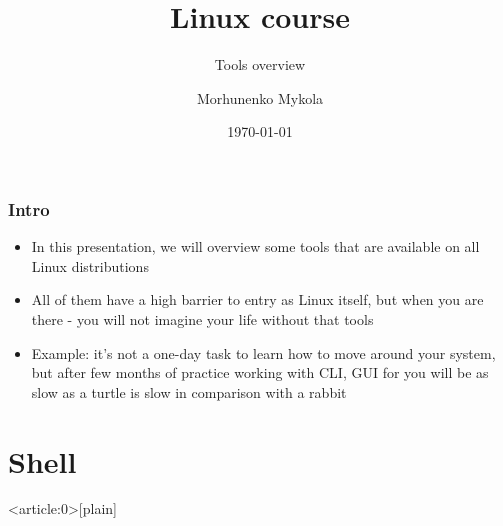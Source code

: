 \documentclass[usenames,dvipsnames,10pt,aspectratio=169]{beamer}
\title{Linux course}
\subtitle{Tools overview}
\date[\today]{\small\today}
\author[Morhunenko Mykola]{Morhunenko Mykola}
\institute{APPS@UCU}
\begin{document}
\begin{frame}
\titlepage
\end{frame}

\begin{frame}{\contentsname}
    \tableofcontents
\end{frame}

\begin{frame}
    \frametitle{Intro}
    \begin{itemize}
        \item In this presentation, we will overview some tools that are available on all Linux distributions
        \item All of them have a high barrier to entry as Linux itself, but when you are there - you will not imagine your life without that tools
        \item Example: it's not a one-day task to learn how to move around your system, but after few months of practice working with CLI, GUI for you will be as slow as a turtle is slow in comparison with a rabbit
    \end{itemize}
\end{frame}

\section{Shell}
{ %
    \begin{frame}<article:0>[plain]
     \end{frame}
}
\end{document}
